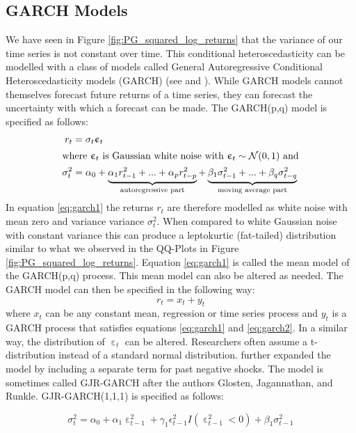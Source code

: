 \subsection{GARCH Models} \label{sec:garch}
We have seen in Figure \ref{fig:PG_squared_log_returns} that the variance of our time series is not constant over time. This conditional heteroscedasticity can be modelled with a class of models called General Autoregressive Conditional Heteroscedasticity models (GARCH) (see \citep{engle_autoregressive_1982} and \citep{bollerslev_generalized_1986}). While GARCH models cannot themselves forecast future returns of a time series, they can forecast the uncertainty with which a forecast can be made. The GARCH(p,q) model is specified as follows:
\begin{align}
    r_{t} &= \sigma_t  \upepsilon_t \label{eq:garch1}\\
\intertext{where $\upepsilon_t$ is Gaussian white noise with  $\upepsilon_t \sim \mathcal{N}(0,1)$ and}
    \sigma^2_t &= \alpha_0 + \underbrace{\alpha_1 r^2_{t-1} + ... + \alpha_p r^2_{t-p}}_\text{autoregressive part} + \underbrace{\beta_1 \sigma^2_{t-1} + ... + \beta_q \sigma^2_{t-q}}_\text{moving average part} \label{eq:garch2}
\end{align}
In equation \ref{eq:garch1} the returns $r_t$ are therefore modelled as white noise with mean zero and variance variance $\sigma^2_t$. When compared to white Gaussian noise with constant variance this can produce a leptokurtic (fat-tailed) distribution similar to what we observed in the QQ-Plots in Figure \ref{fig:PG_squared_log_returns}. Equation \ref{eq:garch1} is called the mean model of the GARCH(p,q) process. This mean model can also be altered as needed. The GARCH model can then be specified in the following way: 
\begin{equation}
    r_t = x_t + y_t
\end{equation}
where $x_t$ can be any constant mean, regression or time series process and $y_t$ is a GARCH process that satisfies equations \ref{eq:garch1} and \ref{eq:garch2}. In a similar way, the distribution of $\upepsilon_t$ can be altered. Researchers often assume a t-distribution instead of a standard normal distribution. 
\citet{glosten_relation_1993} further expanded the model by including a separate term for past negative shocks. The model is sometimes called GJR-GARCH after the authors Glosten, Jagannathan, and Runkle. GJR-GARCH(1,1,1) is specified as follows:

\begin{equation}
    \sigma^2_t = \alpha_0 + \alpha_1 \upepsilon^2_{t-1} + \gamma_1 \epsilon^2_{t-1} I(\upepsilon^2_{t-1} < 0) + \beta_1 \sigma^2_{t-1} \label{eg:garch3}
\end{equation}{}

